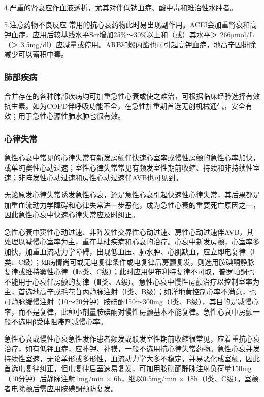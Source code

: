 4.严重的肾衰应作血液透析，尤其对伴低钠血症、酸中毒和难治性水肿者。

5.注意药物不良反应
常用的抗心衰药物此时易出现副作用。ACEI会加重肾衰和高钾血症，应用后较基线水平Scr增加25\%～30\%以上和（或）其水平＞
266μmol/L（＞
3.5mg/dl）应减量或停用。ARB和螺内酯也可引起高钾血症，地高辛因排除减少可以蓄积中毒。

\subsubsection{肺部疾病}

合并存在的各种肺部疾病均可加重急性心衰或使之难治，可根据临床经验选择有效抗生素。如为COPD伴呼吸功能不全，在急性加重期首选无创机械通气，安全有效；用于急性心源性肺水肿也很有效。

\subsubsection{心律失常}

急性心衰中常见的心律失常有新发房颤伴快速心室率或慢性房颤的急性心率加快，或单纯窦性心动过速；室性心律失常常见有频发室性期前收缩、持续和非持续性室速；非阵发性心动过速和房性心动过速伴AVB也可见到。

无论原发心律失常诱发急性心衰，还是急性心衰引起快速性心律失常，其后果都是加重血流动力学障碍和心律失常进一步恶化，成为急性心衰的重要死亡原因之一，因此急性心衰中快速心律失常应及时纠正。

急性心衰中窦性心动过速、非阵发性交界性心动过速、房性心动过速伴AVB，其处理以减慢心室率为主，重在基础疾病和心衰的治疗。心衰中新发房颤，心室率多加快，加重血流动力学障碍，出现低血压、肺水肿、心肌缺血，应立即电复律（Ⅰ类、C级）；如病情尚可或无电复律条件或电复律后房颤复发，则选用胺碘酮静脉复律或维持窦性心律（Ⅱa类、C级）；此时应用伊布利特复律不可取，普罗帕酮也不能用于心衰伴房颤的复律（Ⅲ类、A级）。急性心衰中慢性房颤治疗以控制室率为主，首选地高辛或毛花苷丙静脉注射（Ⅰ类、B级）；如洋地黄控制心率不满意，也可静脉缓慢注射（10～20分钟）胺碘酮150～300mg（Ⅰ类、B级），其目的是减慢心率，而不是复律，此种小剂量胺碘酮对慢性房颤基本不能复律。急性心衰中房颤一般不选用β受体阻滞剂减慢心率。

急性心衰或慢性心衰急性发作患者频发或联发室性期前收缩很常见，应着重抗心衰治疗，如有低钾血症，应补钾、补镁，一般不选用抗心律失常药物。急性心衰并发持续性室速，无论单形或多形性，血流动力学大多不稳定，并易恶化成室颤，因此首选电复律纠正，但电复律后室速易复发，可加用胺碘酮静脉注射负荷量150mg（10分钟）后静脉注射1mg/min
× 6h，继以0.5mg/min ×
18h（Ⅰ类、C级）。室颤者电除颤后需应用胺碘酮预防复发。


